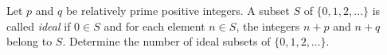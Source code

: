 Let $p$ and $q$ be relatively prime positive integers. A subset $S$ of $\{0, 1, 2, \ldots\}$ is called \emph{ideal} if $0 \in S$ and for each element $n \in S$, the integers $n + p$ and $n + q$ belong to $S$. Determine the number of ideal subsets of $\{0, 1, 2, \ldots\}$.
